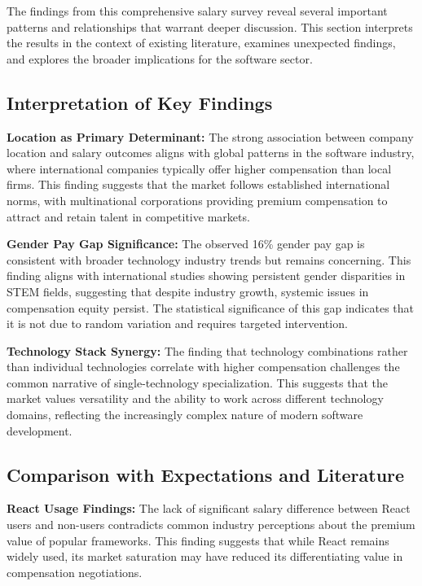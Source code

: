 The findings from this comprehensive salary survey reveal several important patterns and relationships that warrant deeper discussion. This section interprets the results in the context of existing literature, examines unexpected findings, and explores the broader implications for the software sector.

\subsection*{Interpretation of Key Findings}

\textbf{Location as Primary Determinant:} The strong association between company location and salary outcomes aligns with global patterns in the software industry, where international companies typically offer higher compensation than local firms. This finding suggests that the market follows established international norms, with multinational corporations providing premium compensation to attract and retain talent in competitive markets.

\textbf{Gender Pay Gap Significance:} The observed 16\% gender pay gap is consistent with broader technology industry trends but remains concerning. This finding aligns with international studies showing persistent gender disparities in STEM fields, suggesting that despite industry growth, systemic issues in compensation equity persist. The statistical significance of this gap indicates that it is not due to random variation and requires targeted intervention.

\textbf{Technology Stack Synergy:} The finding that technology combinations rather than individual technologies correlate with higher compensation challenges the common narrative of single-technology specialization. This suggests that the market values versatility and the ability to work across different technology domains, reflecting the increasingly complex nature of modern software development.

\subsection*{Comparison with Expectations and Literature}

\textbf{React Usage Findings:} The lack of significant salary difference between React users and non-users contradicts common industry perceptions about the premium value of popular frameworks. This finding suggests that while React remains widely used, its market saturation may have reduced its differentiating value in compensation negotiations.

